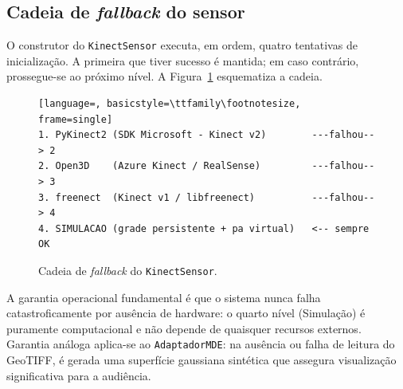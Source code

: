 \subsection{Cadeia de \textit{fallback} do sensor}
\label{subsec:fallback}

O construtor do \texttt{KinectSensor} executa, em ordem, quatro
tentativas de inicialização. A primeira que tiver sucesso é mantida; em
caso contrário, prossegue-se ao próximo nível. A
Figura~\ref{fig:fallback} esquematiza a cadeia.

\begin{figure}[!ht]
\centering
\begin{lstlisting}[language=, basicstyle=\ttfamily\footnotesize, frame=single]
1. PyKinect2 (SDK Microsoft - Kinect v2)        ---falhou--> 2
2. Open3D    (Azure Kinect / RealSense)         ---falhou--> 3
3. freenect  (Kinect v1 / libfreenect)          ---falhou--> 4
4. SIMULACAO (grade persistente + pa virtual)   <-- sempre OK
\end{lstlisting}
\caption{Cadeia de \textit{fallback} do \texttt{KinectSensor}.}
\label{fig:fallback}
\end{figure}

A garantia operacional fundamental é que o sistema nunca falha
catastroficamente por ausência de hardware: o quarto nível
(Simulação) é puramente computacional e não depende de
quaisquer recursos externos. Garantia análoga aplica-se ao
\texttt{AdaptadorMDE}: na ausência ou falha de leitura do GeoTIFF, é
gerada uma superfície gaussiana sintética que assegura visualização
significativa para a audiência.
